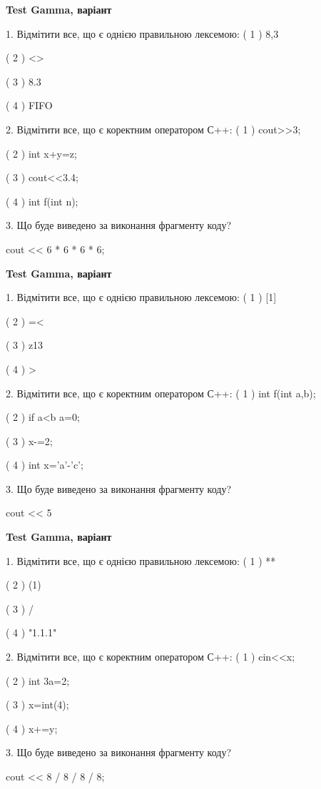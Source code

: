 \documentclass[11pt, ukrainian]{article}
\begin{document}
\begin{large}
\textbf{Test Gamma, варіант }\par

1. Відмітити все, що є однією правильною лексемою:
( 1 ) 8,3

( 2 ) <>

( 3 ) 8.3

( 4 ) FIFO


2. Відмітити все, що є коректним оператором С++:
( 1 ) cout>>3;

( 2 ) int x+y=z;

( 3 ) cout<<3.4;

( 4 ) int f(int n);


3. Що буде виведено за виконання фрагменту коду?

cout << 6 * 6 * 6 * 6;

\end{large}
\vspace{20mm}
\begin{large}
\textbf{Test Gamma, варіант }\par

1. Відмітити все, що є однією правильною лексемою:
( 1 ) [1]

( 2 ) =<

( 3 ) z13

( 4 ) >


2. Відмітити все, що є коректним оператором С++:
( 1 ) int f(int a,b);

( 2 ) if a<b a=0;

( 3 ) x-=2;

( 4 ) int x='a'-'c';


3. Що буде виведено за виконання фрагменту коду?

cout << 5 %

\end{large}
\newpage
\begin{large}
\textbf{Test Gamma, варіант }\par

1. Відмітити все, що є однією правильною лексемою:
( 1 ) **

( 2 ) (1)

( 3 ) /

( 4 ) "1.1.1"


2. Відмітити все, що є коректним оператором С++:
( 1 ) cin<<x;

( 2 ) int 3a=2;

( 3 ) x=int(4);

( 4 ) x+=y;


3. Що буде виведено за виконання фрагменту коду?

cout << 8 / 8 / 8 / 8;

\end{large}
\end{document}
